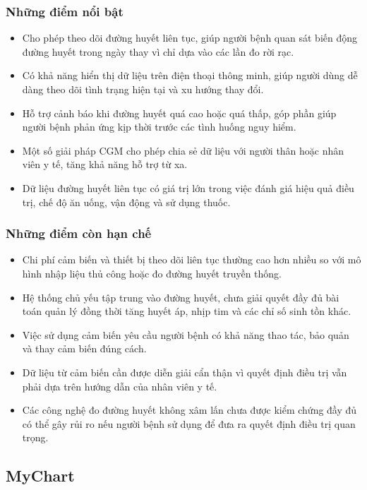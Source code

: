 \subsubsection{Những điểm nổi bật}
\begin{itemize}
    \item Cho phép theo dõi đường huyết liên tục, giúp người bệnh quan sát biến động đường huyết trong ngày thay vì chỉ dựa vào các lần đo rời rạc. \cite{dexcomCGM}
    \item Có khả năng hiển thị dữ liệu trên điện thoại thông minh, giúp người dùng dễ dàng theo dõi tình trạng hiện tại và xu hướng thay đổi.
    \item Hỗ trợ cảnh báo khi đường huyết quá cao hoặc quá thấp, góp phần giúp người bệnh phản ứng kịp thời trước các tình huống nguy hiểm.
    \item Một số giải pháp CGM cho phép chia sẻ dữ liệu với người thân hoặc nhân viên y tế, tăng khả năng hỗ trợ từ xa.
    \item Dữ liệu đường huyết liên tục có giá trị lớn trong việc đánh giá hiệu quả điều trị, chế độ ăn uống, vận động và sử dụng thuốc.
\end{itemize}

\subsubsection{Những điểm còn hạn chế}
\begin{itemize}
    \item Chi phí cảm biến và thiết bị theo dõi liên tục thường cao hơn nhiều so với mô hình nhập liệu thủ công hoặc đo đường huyết truyền thống.
    \item Hệ thống chủ yếu tập trung vào đường huyết, chưa giải quyết đầy đủ bài toán quản lý đồng thời tăng huyết áp, nhịp tim và các chỉ số sinh tồn khác.
    \item Việc sử dụng cảm biến yêu cầu người bệnh có khả năng thao tác, bảo quản và thay cảm biến đúng cách.
    \item Dữ liệu từ cảm biến cần được diễn giải cẩn thận vì quyết định điều trị vẫn phải dựa trên hướng dẫn của nhân viên y tế.
    \item Các công nghệ đo đường huyết không xâm lấn chưa được kiểm chứng đầy đủ có thể gây rủi ro nếu người bệnh sử dụng để đưa ra quyết định điều trị quan trọng. \cite{fdaGlucoseWatchWarning}
\end{itemize}

\subsection{MyChart}

